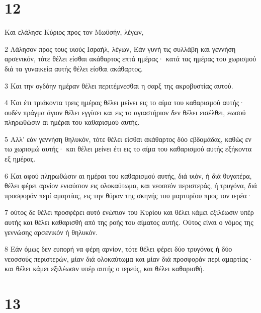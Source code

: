 \chapter{12}

\par Και ελάλησε Κύριος προς τον Μωϋσήν, λέγων,
\par 2 Λάλησον προς τους υιούς Ισραήλ, λέγων, Εάν γυνή τις συλλάβη και γεννήση αρσενικόν, τότε θέλει είσθαι ακάθαρτος επτά ημέρας· κατά τας ημέρας του χωρισμού διά τα γυναικεία αυτής θέλει είσθαι ακάθαρτος.
\par 3 Και την ογδόην ημέραν θέλει περιτέμνεσθαι η σαρξ της ακροβυστίας αυτού.
\par 4 Και έτι τριάκοντα τρεις ημέρας θέλει μείνει εις το αίμα του καθαρισμού αυτής· ουδέν πράγμα άγιον θέλει εγγίσει και εις το αγιαστήριον δεν θέλει εισέλθει, εωσού πληρωθώσιν αι ημέραι του καθαρισμού αυτής.
\par 5 Αλλ' εάν γεννήση θηλυκόν, τότε θέλει είσθαι ακάθαρτος δύο εβδομάδας, καθώς εν τω χωρισμώ αυτής· και θέλει μείνει έτι εις το αίμα του καθαρισμού αυτής εξήκοντα εξ ημέρας.
\par 6 Και αφού πληρωθώσιν αι ημέραι του καθαρισμού αυτής, διά υιόν, ή διά θυγατέρα, θέλει φέρει αρνίον ενιαύσιον εις ολοκαύτωμα, και νεοσσόν περιστεράς, ή τρυγόνα, διά προσφοράν περί αμαρτίας, εις την θύραν της σκηνής του μαρτυρίου προς τον ιερέα·
\par 7 ούτος δε θέλει προσφέρει αυτό ενώπιον του Κυρίου και θέλει κάμει εξιλέωσιν υπέρ αυτής και θέλει καθαρισθή από της ροής του αίματος αυτής. Ούτος είναι ο νόμος της γεννώσης αρσενικόν ή θηλυκόν.
\par 8 Εάν όμως δεν ευπορή να φέρη αρνίον, τότε θέλει φέρει δύο τρυγόνας ή δύο νεοσσούς περιστερών, μίαν διά ολοκαύτωμα και μίαν διά προσφοράν περί αμαρτίας· και θέλει κάμει εξιλέωσιν υπέρ αυτής ο ιερεύς, και θέλει καθαρισθή.

\chapter{13}

